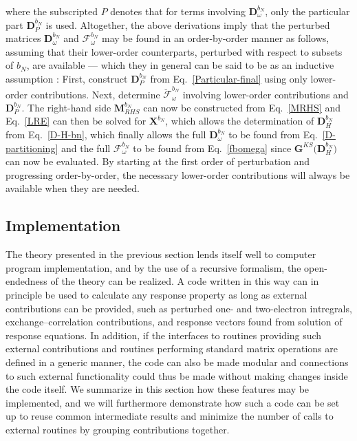 \documentclass[%
 reprint,
 amsmath,amssymb,
 aps,
]{revtex4-1}
\begin{document}
where the subscripted $P$ denotes that for terms involving $\mathbf{D}^{b_N}_{\omega}$, only the particular part $\mathbf{D}^{b_N}_{P}$ is used. Altogether, the above derivations imply that the perturbed matrices $\mathbf{D}^{b_N}_{\omega}$ and $\bm{\mathcal{F}}^{b_{N}}_{\omega}$ may be found in an order-by-order manner as follows, assuming that their lower-order counterparts, perturbed with respect to subsets of $b_{N}$, are available --- which they in general can be said to be as an inductive assumption : First, construct $\mathbf{D}^{b_N}_{P}$ from Eq.~\eqref{Particular-final} using only lower-order contributions. Next, determine $\breve{\bm{\mathcal{F}}}^{b_{N}}_{\omega}$ involving lower-order contributions and $\mathbf{D}^{b_N}_{P}$. The right-hand side $\mathbf{M}_{RHS}^{b_N}$ can now be constructed from Eq.~\eqref{MRHS}  and Eq.~\eqref{LRE} can then be solved for $\mathbf{X}^{b_N}$, which allows the determination of $\mathbf{D}_{H}^{b_N}$ from Eq.~\eqref{D-H-bn}, which finally allows the full $\mathbf{D}^{b_N}_{\omega}$ to be found from Eq.~\eqref{D-partitioning} and the full $\bm{\mathcal{F}}^{b_{N}}_{\omega}$ to be found from Eq.~\eqref{fbomega} since $\mathbf{G}^{KS} \bigl( \mathbf{D}_{H}^{b_{N}} \bigr)$ can now be evaluated. By starting at the first order of perturbation and progressing order-by-order, the necessary lower-order contributions will always be available when they are needed.









\subsection{Implementation}
\label{routines}

The theory presented in the previous section lends itself well to computer program implementation, and by the use of a recursive formalism, the open-endedness of the theory can be realized. A code written in this way can in principle be used to calculate any response property as long as external contributions can be provided, such as perturbed one- and two-electron intregrals, exchange--correlation contributions, and response vectors found from solution of response equations. In addition, if the interfaces to routines providing such external contributions and routines performing standard matrix operations are defined in a generic manner, the code can also be made modular and connections to such external functionality could thus be made without making changes inside the code itself. We summarize in this section how these features may be implemented, and we will furthermore demonstrate how such a code can be set up to reuse common intermediate results and minimize the number of calls to external routines by grouping contributions together.
\end{document}
